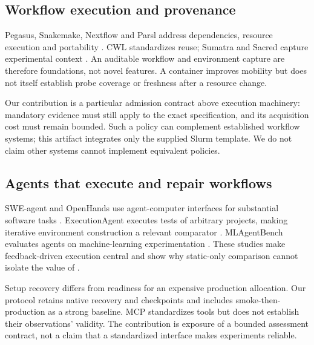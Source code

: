 \subsection{Workflow execution and provenance}
Pegasus, Snakemake, Nextflow and Parsl address dependencies, resource execution and portability \cite{deelman2015pegasus,molder2021snakemake,ditommaso2017nextflow,babuji2019parsl}. CWL standardizes reuse; Sumatra and Sacred capture experimental context \cite{crusoe2022cwl,davison2012sumatra,greff2017sacred}. An auditable workflow and environment capture are therefore foundations, not novel \tool{} features. A container improves mobility but does not itself establish probe coverage or freshness after a resource change.

Our contribution is a particular admission contract above execution machinery: mandatory evidence must still apply to the exact specification, and its acquisition cost must remain bounded. Such a policy can complement established workflow systems; this artifact integrates only the supplied Slurm template. We do not claim other systems cannot implement equivalent policies.

\subsection{Agents that execute and repair workflows}
SWE-agent and OpenHands use agent-computer interfaces for substantial software tasks \cite{yang2024sweagent,wang2025openhands}. ExecutionAgent executes tests of arbitrary projects, making iterative environment construction a relevant comparator \cite{bouzenia2025executionagent}. MLAgentBench evaluates agents on machine-learning experimentation \cite{huang2024mlagentbench}. These studies make feedback-driven execution central and show why static-only comparison cannot isolate the value of \tool{}.

Setup recovery differs from readiness for an expensive production allocation. Our protocol retains native recovery and checkpoints and includes smoke-then-production as a strong baseline. MCP standardizes tools but does not establish their observations' validity. The contribution is exposure of a bounded assessment contract, not a claim that a standardized interface makes experiments reliable.

